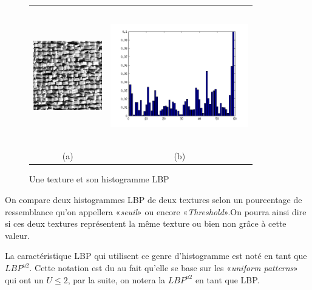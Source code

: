 \begin{figure}[H]
\centering
\begin{tabular}{cc}
\centering

\includegraphics[width=3cm,height=6cm]{Figures/chap1/in1.png}
&
\includegraphics[width=6cm,height=6cm]{Figures/chap1/histo1.png}\\
(a) & (b) \\
\end{tabular}
\caption[histo]{Une texture et son histogramme LBP }
\end{figure}


\indent On compare deux histogrammes LBP de deux textures selon un pourcentage de ressemblance qu'on appellera «\textit{seuil}» ou encore «\textit{Threshold}».On pourra ainsi dire si ces deux textures représentent la même texture ou bien non grâce à cette valeur. 

\indent La caractéristique LBP qui utilisent ce genre d'histogramme est noté en tant que $LBP^{u2}$. Cette notation est du au fait qu'elle se base sur les «\textit{uniform patterns}» qui ont un $U \leq 2$, par la suite, on notera la $LBP^{u2}$ en tant que LBP.


